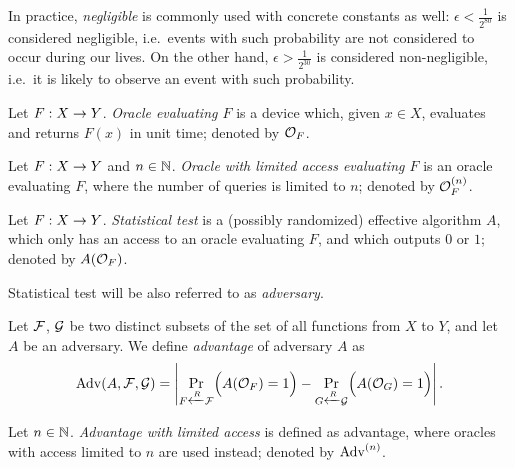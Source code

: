 \begin{note}
\label{note:neglconst}
	In practice, {\em negligible} is commonly used with concrete constants as well: $\epsilon<\frac{1}{2^{80}}$ is considered negligible, i.e.\ events with such probability are not considered to occur during our lives. On the other hand, $\epsilon>\frac{1}{2^{30}}$ is considered non-negligible, i.e.\ it is likely to observe an event with such probability.
\end{note}

\begin{defn}[Oracle]
\label{def:oracle}
	Let $F:X\rightarrow Y$. {\em Oracle evaluating $F$} is a device which, given $x\in X$, evaluates and returns $F(x)$ in unit time; denoted by ${\cal O}_F$.
\end{defn}

\begin{defn}   %
\label{def:saoracle}
	Let $F:X\rightarrow Y$ and $n\in\mathbb{N}$. {\em Oracle with limited access evaluating $F$} is an oracle evaluating $F$, where the number of queries is limited to $n$; denoted by ${\cal O}^{(n)}_F$.
\end{defn}

\begin{defn}
\label{def:stattest}
	Let $F:X\rightarrow Y$. {\em Statistical test} is a (possibly randomized) effective algorithm $A$, which only has an access to an oracle evaluating $F$, and which outputs $0$ or $1$; denoted by $A({\cal O}_F)$.
\end{defn}

\begin{note}
	Statistical test will be also referred to as {\em adversary}.
\end{note}

\begin{defn}[Advantage]
\label{def:advant}
	Let $\cal F$, $\cal G$ be two distinct subsets of the set of all functions from $X$ to $Y$, and let $A$ be an adversary. We define {\em advantage} of adversary $A$ as
	\[
		\operatorname*{Adv}(A,{\cal F},{\cal G}) = \left| \Pr\limits_{F\xleftarrow{R} {\cal F}}\Bigl(A({\cal O}_F)=1\Bigr) - \Pr\limits_{G\xleftarrow{R} {\cal G}}\Bigl(A({\cal O}_G)=1\Bigr) \right| .
	\]
\end{defn}

\begin{defn}   %
\label{def:saadvant}
	Let $n\in\mathbb{N}$. {\em Advantage with limited access} is defined as advantage, where oracles with access limited to $n$ are used instead; denoted by ${\operatorname*{Adv}}^{(n)}$.
\end{defn}

